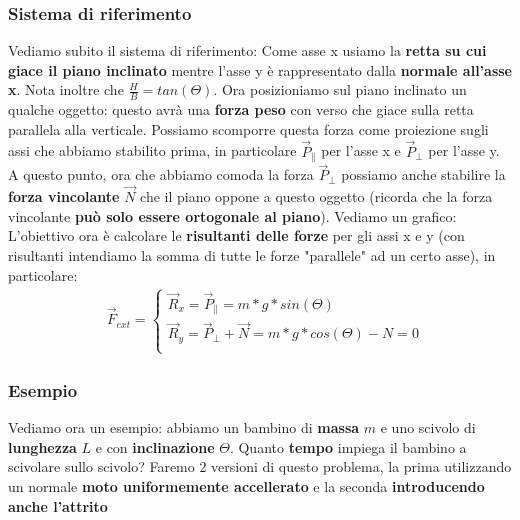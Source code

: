         \subsubsection{Sistema di riferimento}
            Vediamo subito il sistema di riferimento:
            Come asse x usiamo la \textbf{retta su cui giace il piano inclinato} mentre l'asse y è rappresentato dalla \textbf{normale all'asse x}. Nota inoltre che $\frac{H}{B} = tan(\Theta)$.
            Ora posizioniamo sul piano inclinato un qualche oggetto: questo avrà una \textbf{forza peso} con verso che giace sulla retta parallela alla verticale. Possiamo scomporre questa forza come proiezione sugli assi che abbiamo stabilito prima, in particolare $\vec{P}_\parallel$ per l'asse x e $\vec{P}_\bot$ per l'asse y. A questo punto, ora che abbiamo comoda la forza $\vec{P}_\bot$ possiamo anche stabilire la \textbf{forza vincolante} $\vec{N}$ che il piano oppone a questo oggetto (ricorda che la forza vincolante \textbf{può solo essere ortogonale al piano}). Vediamo un grafico:
            L'obiettivo ora è calcolare le \textbf{risultanti delle forze} per gli assi x e y (con risultanti intendiamo la somma di tutte le forze "parallele" ad un certo asse), in particolare:
            \begin{align*}
                &\vec{F}_{ext} =
                \begin{cases}
                    \vec{R}_x = \vec{P}_\parallel = m*g*sin(\Theta)\\
                    \vec{R}_y = \vec{P}_\bot + \vec{N} = m*g*cos(\Theta) - N = 0\\
                \end{cases}
            \end{align*}

        \subsubsection{Esempio}
            Vediamo ora un esempio: abbiamo un bambino di \textbf{massa} $m$ e uno scivolo di \textbf{lunghezza} $L$ e con \textbf{inclinazione} $\Theta$. Quanto \textbf{tempo} impiega il bambino a scivolare sullo scivolo? Faremo 2 versioni di questo problema, la prima utilizzando un normale \textbf{moto uniformemente accellerato} e la seconda \textbf{introducendo anche l'attrito}
